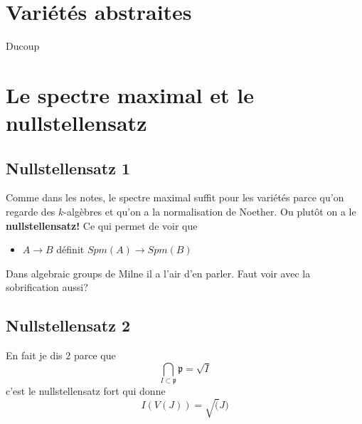 \documentclass[a4paper,12pt]{book}
\newcommand{\p}{\mathfrak{p}}
\theoremstyle{plain}
\theoremstyle{definition}
\theoremstyle{remark}
\begin{document}
\chapter{Variétés abstraites}
Ducoup 

\chapter{Le spectre maximal et le nullstellensatz}
\section{Nullstellensatz 1}
Comme dans les notes, le spectre maximal suffit pour 
les variétés parce qu'on regarde des $k$-algèbres et
qu'on a la normalisation de Noether. Ou plutôt on a le 
\textbf{nullstellensatz!} Ce qui permet de voir que 
\begin{itemize}
    \item $A\to B$ définit $Spm(A)\to Spm(B)$
\end{itemize}
Dans algebraic groups de Milne il a l'air d'en parler. Faut voir
avec la sobrification aussi?
\section{Nullstellensatz 2}
En fait je dis $2$ parce que 
\[\bigcap_{I\subset \p} \p =\sqrt{I}\]
c'est le nullstellensatz fort qui donne 
\[I(V(J))=\sqrt(J)\]

\printbibliography
\end{document}
